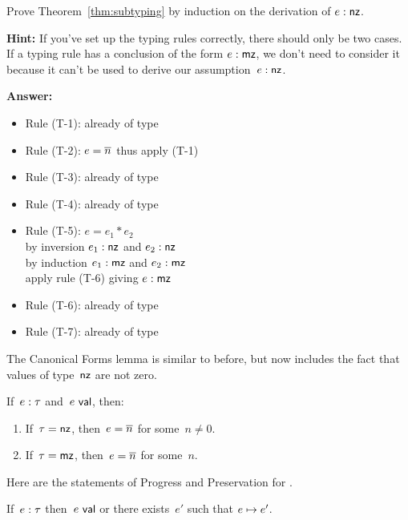\documentclass{article}
\begin{document}
\begin{task}
  Prove Theorem~\ref{thm:subtyping} by induction on the derivation of
  $e : \mathsf{nz}$.

  \textbf{Hint:} If you've set up the typing rules correctly, there should
  only be two cases. If a typing rule has a conclusion of the form
  $e : \mathsf{mz}$, we don't need to consider it because it can't be used
  to derive our assumption~$e : \mathsf{nz}$.
\end{task}

\textbf{Answer:}
\begin{itemize}
    \item Rule (T-1): already of type \kwmz 
    \item Rule (T-2): $e = \overline{n}$ thus apply (T-1)
    \item Rule (T-3): already of type \kwmz
    \item Rule (T-4): already of type \kwmz
    \item Rule (T-5): $e = e_1 * e_2$ \\
        by inversion $e_1 : \mathsf{nz}$ and $e_2 : \mathsf{nz}$\\
        by induction $e_1 : \mathsf{mz}$ and $e_2 : \mathsf{mz}$\\
        apply rule (T-6) giving $e : \mathsf{mz}$
    \item Rule (T-6): already of type \kwmz
    \item Rule (T-7): already of type \kwmz
\end{itemize}

The Canonical Forms lemma is similar to before, but now includes the fact that
values of type~$\mathsf{nz}$ are not zero.

\begin{lemma}
  If~$e : \tau$ and~$e ~\mathsf{val}$, then:
  \begin{enumerate}
  \item If~$\tau = \mathsf{nz}$, then~$e = \overline{n}$ for some~$n \neq 0$.
  \item If~$\tau = \mathsf{mz}$, then~$e = \overline{n}$ for some~$n$.
  \end{enumerate}
\end{lemma}

Here are the statements of Progress and Preservation for {\ezlang}.

\begin{thm}[Progress]
  If~$e : \tau$ then~$e ~\mathsf{val}$ or there exists~$e'$ such that
  $e \mapsto e'$.
\end{thm}
\end{document}

